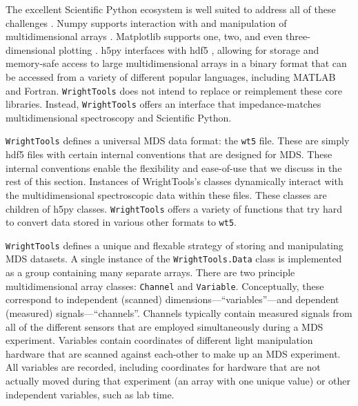 The excellent Scientific Python ecosystem is well suited to address all
of these challenges \cite{OliphantTravisE2007a}. Numpy supports
interaction with and manipulation of multidimensional arrays
\cite{OliphantTravisE2006a}. Matplotlib supports one, two, and even
three-dimensional plotting \cite{HunterJohnD2007a}. h5py
\cite{ColletteAndrew2013} interfaces with hdf5 \cite{hdf5}, allowing for
storage and memory-safe access to large multidimensional arrays in a
binary format that can be accessed from a variety of different popular
languages, including MATLAB and Fortran. \texttt{WrightTools} does not
intend to replace or reimplement these core libraries. Instead,
\texttt{WrightTools} offers an interface that impedance-matches
multidimensional spectroscopy and Scientific Python.

\texttt{WrightTools} defines a universal MDS data format: the
\texttt{wt5} file. These are simply hdf5 files with certain internal
conventions that are designed for MDS. These internal conventions enable
the flexibility and ease-of-use that we discuss in the rest of this
section. Instances of WrightTools's classes dynamically interact with
the multidimensional spectroscopic data within these files. These
classes are children of h5py classes. \texttt{WrightTools} offers a
variety of functions that try hard to convert data stored in various
other formats to \texttt{wt5}.

\texttt{WrightTools} defines a unique and flexable strategy of storing
and manipulating MDS datasets. A single instance of the
\texttt{WrightTools.Data} class is implemented as a group containing
many separate arrays. There are two principle multidimensional array
classes: \texttt{Channel} and \texttt{Variable}. Conceptually, these
correspond to independent (scanned) dimensions---``variables''---and
dependent (measured) signals---``channels''. Channels typically contain
measured signals from all of the different sensors that are employed
simultaneously during a MDS experiment. Variables contain coordinates of
different light manipulation hardware that are scanned against
each-other to make up an MDS experiment. All variables are recorded,
including coordinates for hardware that are not actually moved during
that experiment (an array with one unique value) or other independent
variables, such as lab time.

